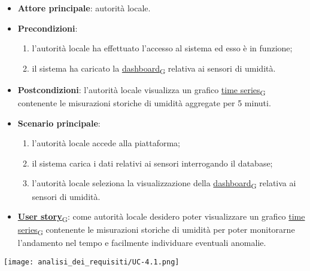 \begin{itemize}
	\item \textbf{Attore principale}: autorità locale.
	\item \textbf{Precondizioni}:
	      \begin{enumerate}
		      \item l'autorità locale ha effettuato l'accesso al sistema ed esso è in funzione;
		      \item il sistema ha caricato la \href{https://7last.github.io/docs/rtb/documentazione-interna/glossario\#dashboard}{dashboard\textsubscript{G}} relativa ai sensori di umidità.
	      \end{enumerate}
	\item \textbf{Postcondizioni}: l'autorità locale visualizza un grafico \href{https://7last.github.io/docs/rtb/documentazione-interna/glossario\#time-series}{time series\textsubscript{G}} contenente le misurazioni storiche di umidità aggregate per 5 minuti.
	\item \textbf{Scenario principale}:
	      \begin{enumerate}
		      \item l'autorità locale accede alla piattaforma;
		      \item il sistema carica i dati relativi ai sensori interrogando il database;
		      \item l'autorità locale seleziona la visualizzazione della \href{https://7last.github.io/docs/rtb/documentazione-interna/glossario\#dashboard}{dashboard\textsubscript{G}} relativa ai sensori di umidità.
	      \end{enumerate}
	\item \href{https://7last.github.io/docs/rtb/documentazione-interna/glossario\#user-story}{\textbf{User story}\textsubscript{G}}:
	      come autorità locale desidero poter visualizzare un grafico \href{https://7last.github.io/docs/rtb/documentazione-interna/glossario\#time-series}{time series\textsubscript{G}} contenente le misurazioni storiche
	      di umidità per poter monitorarne l'andamento nel tempo e facilmente individuare eventuali anomalie.
\end{itemize}
\begin{center}
	\texttt{[image: analisi\_dei\_requisiti/UC-4.1.png]}
\end{center}

